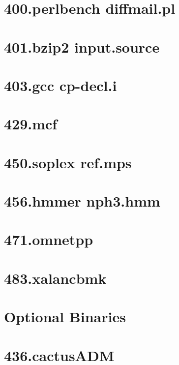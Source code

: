\section*{400.perlbench diffmail.pl}
%

\newpage
\section*{401.bzip2 input.source}
%

\newpage
\section*{403.gcc cp-decl.i}
%

\newpage
\section*{429.mcf}
%

\newpage
\section*{450.soplex ref.mps}
%

\newpage
\section*{456.hmmer nph3.hmm}
%

\newpage
\section*{471.omnetpp}
%

\newpage
\section*{483.xalancbmk}
%

\newpage
\section*{Optional Binaries}
\section*{436.cactusADM}


